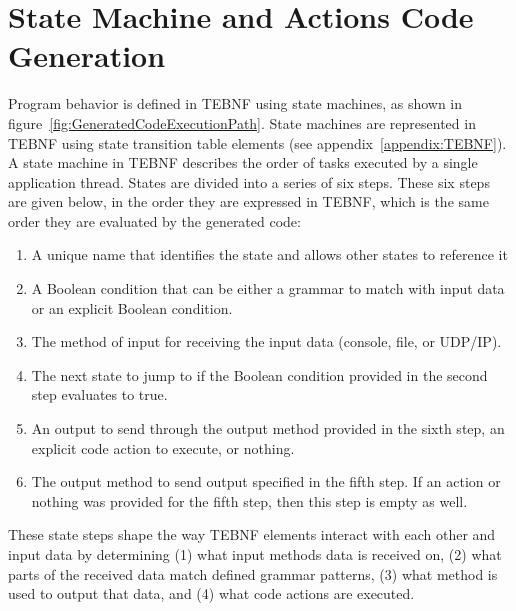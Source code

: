 \section{State Machine and Actions Code Generation}
Program behavior is defined in TEBNF using state machines, as shown in figure~\ref{fig:GeneratedCodeExecutionPath}.  State machines are represented in TEBNF using state transition table elements (see appendix~\ref{appendix:TEBNF}).  A state machine in TEBNF describes the order of tasks executed by a single application thread.  States are divided into a series of six steps.  These six steps are given below, in the order they are expressed in TEBNF, which is the same order they are evaluated by the generated code:
\begin{enumerate}
  \item A unique name that identifies the state and allows other states to reference it
  \item A Boolean condition that can be either a grammar to match with input data or an explicit Boolean condition.
  \item The method of input for receiving the input data (console, file, or UDP/IP).
  \item The next state to jump to if the Boolean condition provided in the second step evaluates to true.
  \item An output to send through the output method provided in the sixth step, an explicit code action to execute, or nothing.
  \item The output method to send output specified in the fifth step.  If an action or nothing was provided for the fifth step, then this step is empty as well.
\end{enumerate}

\indent
These state steps shape the way TEBNF elements interact with each other and input data by determining (1) what input methods data is received on, (2) what parts of the received data match defined grammar patterns, (3) what method is used to output that data, and (4) what code actions are executed.
